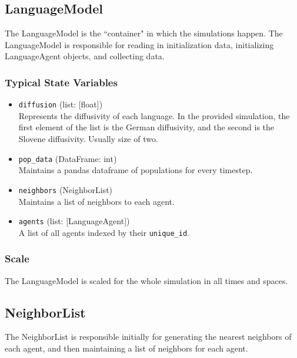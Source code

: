 \documentclass{article}
\begin{document}
\subsection{LanguageModel}
The LanguageModel is the ``container" in which the simulations happen. The LanguageModel is responsible for reading in initialization data, initializing LanguageAgent objects, and collecting data.

\subsubsection{Typical State Variables}
\begin{itemize}
	\item \texttt{diffusion} (list: [float]) \\
	      Represents the diffusivity of each language. In the provided simulation, the first element of the list is the German diffusivity, and the second is the Slovene diffusivity. Usually size of two.
	      
	\item \texttt{pop\_data} (DataFrame: int) \\
	      Maintains a pandas dataframe of populations for every timestep.
	      
	\item \texttt{neighbors} (NeighborList) \\
	      Maintains a list of neighbors to each agent.
	      
	\item \texttt{agents} (list: [LanguageAgent]) \\
	      A list of all agents indexed by their \texttt{unique\_id}.
	      
\end{itemize}

\subsubsection{Scale}
The LanguageModel is scaled for the whole simulation in all times and spaces.

\subsection{NeighborList}
The NeighborList is responsible initially for generating the nearest neighbors of each agent, and then maintaining a list of neighbors for each agent.
\end{document}
